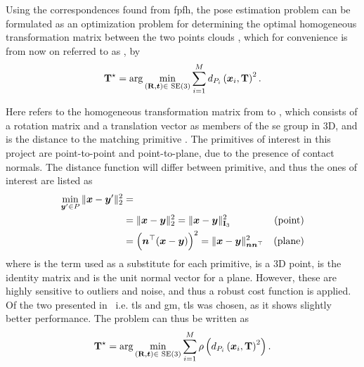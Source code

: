 Using the correspondences found from \gls{fpfh}, the pose estimation problem can be formulated as an optimization problem for determining the optimal homogeneous transformation matrix between the two points clouds , which for convenience is from now on referred to as \tf[T]{\star}{}, by
%
\begin{equation} \label{eq:point-cloud-registration-problem}
	\tf[T]{\star}{} = \arg \min_{(\mat{R},\vec{t})\in\SE (3)} \sum^M_{i=1} d_{P_i}\left( \vec{x}_i, \mat{T} \right)^{2}.
\end{equation}

Here  refers to the homogeneous transformation matrix  from  to , which consists of a rotation matrix  and a translation vector  as members of the \gls{se} group in 3D, and  is the distance to the matching primitive . The primitives of interest in this project are point-to-point and point-to-plane, due to the presence of contact normals. The distance function will differ between primitive, and thus the ones of interest are listed as
%
\begin{align}\label{eq:distance-functions}
	\min_{\vec{y}'\in P} \|\vec{x}-\vec{y}'\|^2_2 &=  \\
		& =\|\vec{x}-\vec{y}\|_2^2=\|\vec{x} - \vec{y}\|_{\mat{I}_3}^2 & \text{(point)} \\
		& = \left( \vec{n}^\T (\vec{x} - \vec{y}) \right)^2=\|\vec{x}-\vec{y}\|^2_{\vec{n}\vec{n}^\T} & \text{(plane)}
\end{align}
where  is the term used as a substitute for each primitive,  is a 3D point,  is the identity matrix and  is the unit normal vector for a plane. However, these are highly sensitive to outliers and noise, and thus a robust cost function \mvar{\rho(\cdot)} is applied. Of the two presented in~\cite{graduated-non-convexity-for-robust-spatial-perception:-from-non-minimal-solvers-to-global-outlier-rejection} i.e. \gls{tls} and \gls{gm}, \gls{tls} was chosen, as it shows slightly better performance. The problem can thus be written as
%
\begin{equation}\label{eq:point-cloud-registration-problem-robust}
		\tf[T]{\star}{} = \arg \min_{(\mat{R},\vec{t})\in\SE (3)} \sum^M_{i=1} \rho\left(d_{P_i}\left( \vec{x}_i, \mat{T} \right)^{2}\right).
\end{equation}

